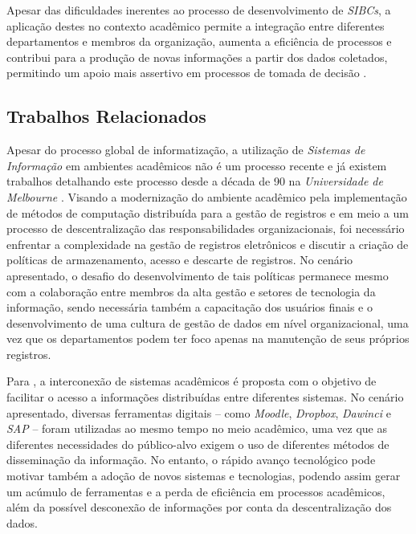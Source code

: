 \documentclass[nonacm, sigconf]{acmart}
\begin{document}
Apesar das dificuldades inerentes ao processo de desenvolvimento de \textit{SIBCs}, a aplicação destes no contexto acadêmico permite a integração entre diferentes departamentos e membros da organização, aumenta a eficiência de processos e contribui para a produção de novas informações a partir dos dados coletados, permitindo um apoio mais assertivo em processos de tomada de decisão \cite{katarina2015}.
\subsection{Trabalhos Relacionados}
\label{section:related-works}

Apesar do processo global de informatização, a utilização de \textit{Sistemas de Informação} em ambientes acadêmicos não é um processo recente e já existem trabalhos detalhando este processo desde a década de 90 na \textit{Universidade de Melbourne} \cite{Davidson_Moscato_1994}. Visando a modernização do ambiente acadêmico pela implementação de métodos de computação distribuída para a gestão de registros e em meio a um processo de descentralização das responsabilidades organizacionais, foi necessário enfrentar a complexidade na gestão de registros eletrônicos e discutir a criação de políticas de armazenamento, acesso e descarte de registros. No cenário apresentado, o desafio do desenvolvimento de tais políticas permanece mesmo com a colaboração entre membros da alta gestão e setores de tecnologia da informação, sendo necessária também a capacitação dos usuários finais e o desenvolvimento de uma cultura de gestão de dados em nível organizacional, uma vez que os departamentos podem ter foco apenas na manutenção de seus próprios registros.

Para \cite{katarina2015}, a interconexão de sistemas acadêmicos é proposta com o objetivo de facilitar o acesso a informações distribuídas entre diferentes sistemas. No cenário apresentado, diversas ferramentas digitais -- como \textit{Moodle}, \textit{Dropbox}, \textit{Dawinci} e \textit{SAP} -- foram utilizadas ao mesmo tempo no meio acadêmico, uma vez que as diferentes necessidades do público-alvo exigem o uso de diferentes métodos de disseminação da informação. No entanto, o rápido avanço tecnológico pode motivar também a adoção de novos sistemas e tecnologias, podendo assim gerar um acúmulo de ferramentas e a perda de eficiência em processos acadêmicos, além da possível desconexão de informações por conta da descentralização dos dados.
\end{document}
